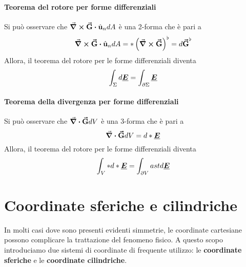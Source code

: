 \paragraph{Teorema del rotore per forme differenziali}
Si può osservare che $\curl{\vba{G}}\vdot \vbh{u}_n dA$ è una 2-forma che è pari a
\begin{equation*}
	\curl{\vba{G}}\vdot \vbh{u}_n dA=\ast\left(\curl{\vba{G}}\right)^\flat=d\vba{G}^\flat
\end{equation*}%
Allora, il teorema del rotore per le forme differenziali diventa
\begin{equation}
	\int_\Sigma d\vb*{\underline{E}}=\int_{\partial \Sigma}\vb*{\underline{E}}
\end{equation}
\paragraph{Teorema della divergenza per forme differenziali}
Si può osservare che $\div{\vb*{\va{G}}}dV$ è una 3-forma che è pari a
\begin{equation*}
	\div{\vb*{\va{G}}}dV=d\ast\vb*{\underline{E}}
\end{equation*}%
Allora, il teorema del rotore per le forme differenziali diventa
\begin{equation}
	\int_V \ast d\ast\vb*{\underline{E}}=\int_{\partial V}ast d\vb*{\underline{E}}
\end{equation}
\section{Coordinate sferiche e cilindriche}
In molti casi dove sono presenti evidenti simmetrie, le coordinate cartesiane possono complicare la trattazione del fenomeno fisico. A questo scopo introduciamo due sistemi di coordinate di frequente utilizzo: le \textbf{coordinate sferiche} e le \textbf{coordinate cilindriche}.
